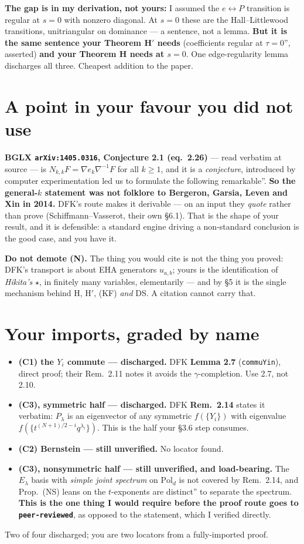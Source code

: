\documentclass[11pt]{article}
\begin{document}
\textbf{The gap is in my derivation, not yours:} I assumed the $e\leftrightarrow P$ transition is
regular at $s=0$ with nonzero diagonal. At $s=0$ these are the Hall--Littlewood transitions,
unitriangular on dominance --- a sentence, not a lemma. \textbf{But it is the same sentence your
Theorem H$'$ needs} (coefficients regular at $\tau=0$'', asserted) \textbf{and your Theorem H
needs at $s=0$}. One edge-regularity lemma discharges all three. Cheapest addition to the paper.

\section{A point in your favour you did not use}
\textbf{BGLX \texttt{arXiv:1405.0316}, Conjecture 2.1 (eq.~2.26)} --- read verbatim at source ---
is $N_{k,k}F=\nabla e_k\nabla^{-1}F$ for all $k\ge1$, and it is a \emph{conjecture}, introduced
by computer experimentation led us to formulate the following remarkable''. \textbf{So the
general-$k$ statement was not folklore to Bergeron, Garsia, Leven and Xin in 2014.} DFK's route
makes it derivable --- on an input they \emph{quote} rather than prove (Schiffmann--Vasserot,
their own \S6.1). That is the shape of your result, and it is defensible: a standard engine
driving a non-standard conclusion is the good case, and you have it.

\textbf{Do not demote (N).} The thing you would cite is not the thing you proved: DFK's
transport is about EHA generators $u_{a,b}$; yours is the identification of \emph{Hikita's}
$\star$, in finitely many variables, elementarily --- and by \S5 it is the single mechanism
behind H, H$'$, (KF) \emph{and} DS. A citation cannot carry that.

\section{Your imports, graded by name}
\begin{itemize}\itemsep2pt
\item \textbf{(C1) the $Y_i$ commute --- discharged.} DFK \textbf{Lemma 2.7} (\texttt{commuYin}),
direct proof; their Rem.~2.11 notes it avoids the $\gamma$-completion. Use 2.7, not 2.10.
\item \textbf{(C3), symmetric half --- discharged.} DFK \textbf{Rem.~2.14} states it verbatim:
$P_\lambda$ is an eigenvector of any symmetric $f(\{Y_i\})$ with eigenvalue
$f(\{t^{(N+1)/2-i}q^{\lambda_i}\})$. This is the half your \S3.6 step consumes.
\item \textbf{(C2) Bernstein --- still unverified.} No locator found.
\item \textbf{(C3), nonsymmetric half --- still unverified, and load-bearing.} The $E_\lambda$
basis with \emph{simple joint spectrum} on $\mathrm{Pol}_d$ is not covered by Rem.~2.14, and
Prop.~(NS) leans on the $t$-exponents are distinct'' to separate the spectrum. \textbf{This is
the one thing I would require before the proof route goes to \texttt{peer-reviewed}}, as opposed
to the statement, which I verified directly.
\end{itemize}
Two of four discharged; you are two locators from a fully-imported proof.
\end{document}

